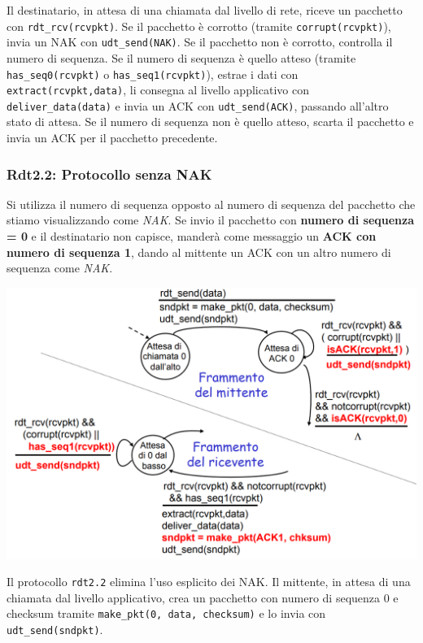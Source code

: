 Il destinatario, in attesa di una chiamata dal livello di rete, riceve un pacchetto con \texttt{rdt\_rcv(rcvpkt)}. Se il pacchetto è corrotto (tramite \texttt{corrupt(rcvpkt)}), invia un NAK con \texttt{udt\_send(NAK)}. Se il pacchetto non è corrotto, controlla il numero di sequenza. Se il numero di sequenza è quello atteso (tramite \texttt{has\_seq0(rcvpkt)} o \texttt{has\_seq1(rcvpkt)}), estrae i dati con \texttt{extract(rcvpkt,data)}, li consegna al livello applicativo con \texttt{deliver\_data(data)} e invia un ACK con \texttt{udt\_send(ACK)}, passando all'altro stato di attesa. Se il numero di sequenza non è quello atteso, scarta il pacchetto e invia un ACK per il pacchetto precedente.

\subsubsection*{Rdt2.2: Protocollo senza NAK}
Si utilizza il numero di sequenza opposto al numero di sequenza del pacchetto che stiamo visualizzando come \textit{NAK}. Se invio il pacchetto con \textbf{numero di sequenza = 0} e il destinatario non capisce, manderà come messaggio un \textbf{ACK con numero di sequenza 1}, dando al mittente un ACK con un altro numero di sequenza come \textit{NAK}.

\begin{center}
\includegraphics[width=\textwidth]{./img/rdt2.2nonak.png}
\end{center}

Il protocollo \texttt{rdt2.2} elimina l'uso esplicito dei NAK. Il mittente, in attesa di una chiamata dal livello applicativo, crea un pacchetto con numero di sequenza 0 e checksum tramite \texttt{make\_pkt(0, data, checksum)} e lo invia con \texttt{udt\_send(sndpkt)}. 

